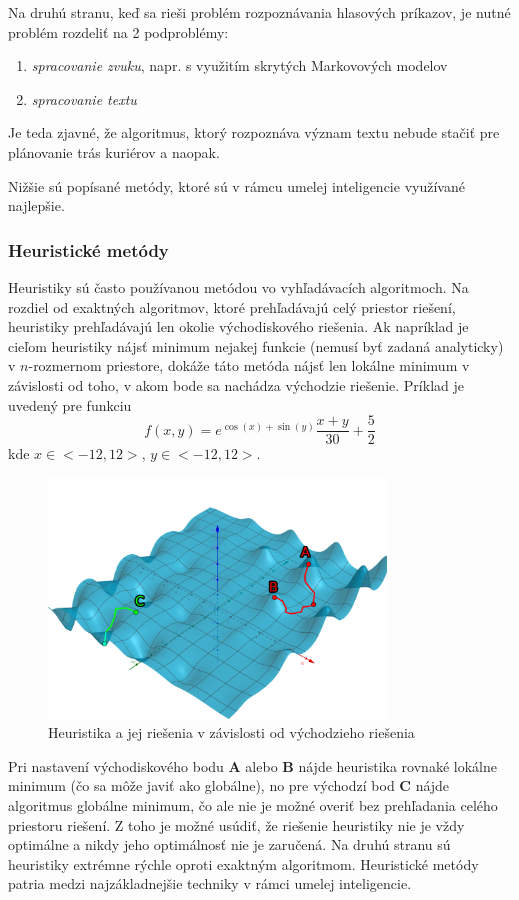 Na druhú stranu, keď sa rieši problém rozpoznávania hlasových príkazov, je nutné problém rozdeliť na 2 podproblémy:
\begin{enumerate}
    \item \emph{spracovanie zvuku}, napr. s využitím skrytých Markovových modelov\cite{hmm}
    \item \emph{spracovanie textu}\cite{text_analysis}
\end{enumerate}

Je teda zjavné, že algoritmus, ktorý rozpoznáva význam textu nebude stačiť pre plánovanie trás kuriérov a naopak.

Nižšie sú popísané metódy, ktoré sú v rámcu umelej inteligencie využívané najlepšie.

\subsubsection{Heuristické metódy}

Heuristiky sú často používanou metódou vo vyhľadávacích algoritmoch.\cite{heuristic}
Na rozdiel od exaktných algoritmov, ktoré prehľadávajú celý priestor riešení, heuristiky prehľadávajú len okolie
východiskového riešenia.
Ak napríklad je cieľom heuristiky nájsť minimum nejakej funkcie (nemusí byť zadaná analyticky) v $n$-rozmernom priestore,
dokáže táto metóda nájsť len lokálne minimum v závislosti od toho, v akom bode sa nachádza východzie riešenie.
Príklad je uvedený pre funkciu
\begin{equation}
    f(x,y)=e^{\cos(x)+\sin(y)}\frac{x+y}{30}+\frac{5}{2}
\end{equation}
kde $x\in<-12,12>$, $y\in<-12,12>$.
\begin{figure}[H]
    \centering
    \includegraphics[width=0.8\textwidth]{images/heuristic.png}
    \caption{Heuristika a jej riešenia v závislosti od východzieho riešenia}
\end{figure}\label{figure:heuristic-method}
Pri nastavení východiskového bodu \textbf{A} alebo \textbf{B} nájde heuristika rovnaké lokálne minimum (čo sa môže javiť
ako globálne), no pre východzí bod \textbf{C} nájde algoritmus globálne minimum, čo ale nie je možné overiť bez
prehľadania celého priestoru riešení.
Z toho je možné usúdiť, že riešenie heuristiky nie je vždy optimálne a nikdy jeho optimálnosť nie je zaručená.
Na druhú stranu sú heuristiky extrémne rýchle oproti exaktným algoritmom.
Heuristické metódy patria medzi najzákladnejšie techniky v rámci umelej inteligencie.

